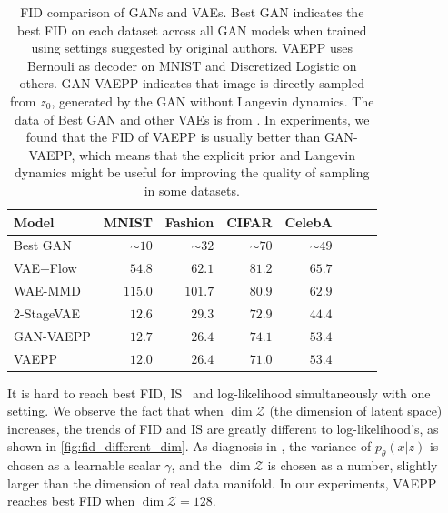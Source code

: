 \begin{table}[tb]
\centering
\begin{tabular}{lrrrrrrr}  
\toprule
Model & MNIST & Fashion & CIFAR & CelebA\\
\midrule
Best GAN   & $\sim10$& $\sim32$&$\sim70$& $\sim49$\\
VAE+Flow   & $54.8$  & $62.1$  & $81.2$ & $65.7$\\
WAE-MMD    & $115.0$ & $101.7$ & $80.9$ & $62.9$\\
2-StageVAE & $12.6$  & $29.3$  & $72.9$ & $44.4$\\
GAN-VAEPP  & $12.7$  & $26.4$  & $74.1$ & $53.4$ \\
VAEPP      & $12.0$  & $26.4$  & $71.0$ & $53.4$ \\
\bottomrule
\end{tabular} 
\caption{FID comparison of GANs and VAEs. Best GAN indicates the best FID on each dataset across all GAN models when trained using settings suggested by original authors. VAEPP uses Bernouli as decoder on MNIST and Discretized Logistic on others. 
GAN-VAEPP indicates that image is directly sampled from $z_0$, generated by the GAN without Langevin dynamics. The data of Best GAN and other VAEs is from \protect\cite{dai2019diagnosing}. In experiments, we found that the FID of VAEPP is usually better than GAN-VAEPP, which means that the explicit prior and Langevin dynamics might be useful for improving the quality of sampling in some datasets.
}\label{tab:compare_FID}
\end{table}

It is hard to reach best FID, IS~\cite{salimans2016improved} and log-likelihood simultaneously with one setting. We observe the fact that when $\dim \mathcal{Z}$ (the dimension of latent space) increases, the trends of FID and IS are greatly different to log-likelihood's, as shown in \cref{fig:fid_different_dim}. As diagnosis in \cite{dai2019diagnosing}, the variance of $p_\theta(x|z)$ is chosen as a learnable scalar $\gamma$, and the $\dim \mathcal{Z}$ is chosen as a number, slightly larger than the dimension of real data manifold. In our experiments, VAEPP reaches best FID when $\dim \mathcal{Z} = 128$.  

